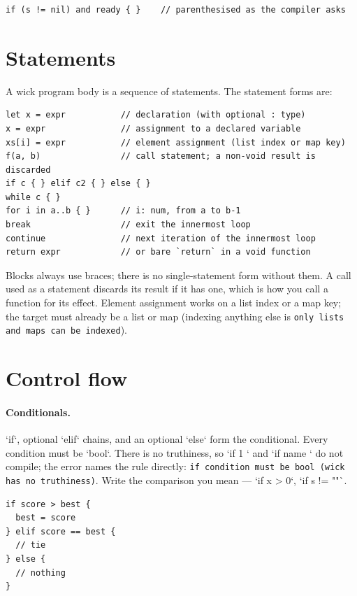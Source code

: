 \begin{lstlisting}[language=wick]
if (s != nil) and ready { }    // parenthesised as the compiler asks
\end{lstlisting}

\section{Statements}

A wick program body is a sequence of statements. The statement forms are:

\begin{lstlisting}[language=wick]
let x = expr           // declaration (with optional : type)
x = expr               // assignment to a declared variable
xs[i] = expr           // element assignment (list index or map key)
f(a, b)                // call statement; a non-void result is discarded
if c { } elif c2 { } else { }
while c { }
for i in a..b { }      // i: num, from a to b-1
break                  // exit the innermost loop
continue               // next iteration of the innermost loop
return expr            // or bare `return` in a void function
\end{lstlisting}

\noindent
Blocks always use braces; there is no single-statement form without them. A
call used as a statement discards its result if it has one, which is how you
call a function for its effect. Element assignment works on a list index or a
map key; the target must already be a list or map (indexing anything else is
\texttt{only lists and maps can be indexed}).

\section{Control flow}

\paragraph{Conditionals.} `if`, optional `elif` chains, and an optional `else`
form the conditional. Every condition must be `bool`. There is no truthiness,
so `if 1 { }` and `if name { }` do not compile; the error names the rule
directly: \texttt{if condition must be bool (wick has no truthiness)}. Write
the comparison you mean --- `if x > 0`, `if s != ""`.

\begin{lstlisting}[language=wick]
if score > best {
  best = score
} elif score == best {
  // tie
} else {
  // nothing
}
\end{lstlisting}

